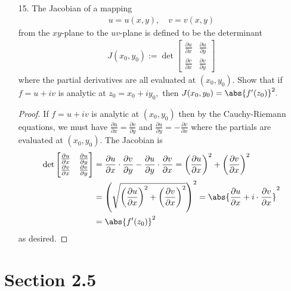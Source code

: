 \documentclass{article}
\begin{document}
\begin{itemize}
	\item[15.] The Jacobian of a mapping 
		\begin{align*}
			u=u(x, y), \quad v=v(x, y)
		\end{align*}
		from the $xy$-plane to the $uv$-plane is defined to be the determinant
		\begin{align*}
			J(x_0, y_0) := \det{\begin{bmatrix}
				\frac{\partial u}{\partial x} & \frac{\partial u}{\partial y} \\
				\frac{\partial v}{\partial x} & \frac{\partial v}{\partial y}
			\end{bmatrix}}
		\end{align*}
		where the partial derivatives are all evaluated at $(x_0, y_0).$ Show that if $f=u+iv$ is analytic at $z_0=x_0+iy_0,$ then $J(x_0, y_0)=\abs{f'(z_0)}^2.$
		\begin{proof}
			If $f=u +iv$ is analytic at $(x_0, y_0)$ then by the Cauchy-Riemann equations, we must have $\frac{\partial u}{\partial x} = \frac{\partial v}{\partial y}$ and $\frac{\partial u}{\partial y} = -\frac{\partial v}{\partial x}$ where the partials are evaluated at $(x_0, y_0).$ The Jacobian is
			\begin{align*}
				\det \begin{bmatrix}
					\frac{\partial u}{\partial x} & \frac{\partial u}{\partial y} \\
					\frac{\partial v}{\partial x} & \frac{\partial v}{\partial y}
				\end{bmatrix} &= \frac{\partial u}{\partial x} \cdot \frac{\partial v}{\partial y} - \frac{\partial u}{\partial y}\cdot \frac{\partial v}{\partial x} = \left( \frac{\partial u}{\partial x} \right)^2 + \left( \frac{\partial v}{\partial x} \right)^2 \\ 
				&= \left( \sqrt{\left( \frac{\partial u}{\partial x} \right)^2 + \left( \frac{\partial v}{\partial x} \right)^2} \right)^2 = \abs{\frac{\partial u}{\partial x} + i\cdot\frac{\partial v}{\partial x}}^2 \\
				&= \abs{f'(z_0)}^2
			\end{align*}
			as desired.
		\end{proof}

\end{itemize}

\section*{Section 2.5}
\end{document}
